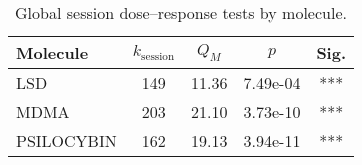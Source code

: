 \begin{table}[htbp]
  \centering
  \caption{Global session dose--response tests by molecule.}
  \label{tab:dr-global-session}
  \begin{tabular}{lcccc}
    \toprule
    Molecule & $k_{\text{session}}$ & $Q_M$ & $p$ & Sig. \\
    \midrule
    LSD & 149 & 11.36 & 7.49e-04 & *** \\
    MDMA & 203 & 21.10 & 3.73e-10 & *** \\
    PSILOCYBIN & 162 & 19.13 & 3.94e-11 & *** \\
    \bottomrule
  \end{tabular}
\end{table}
